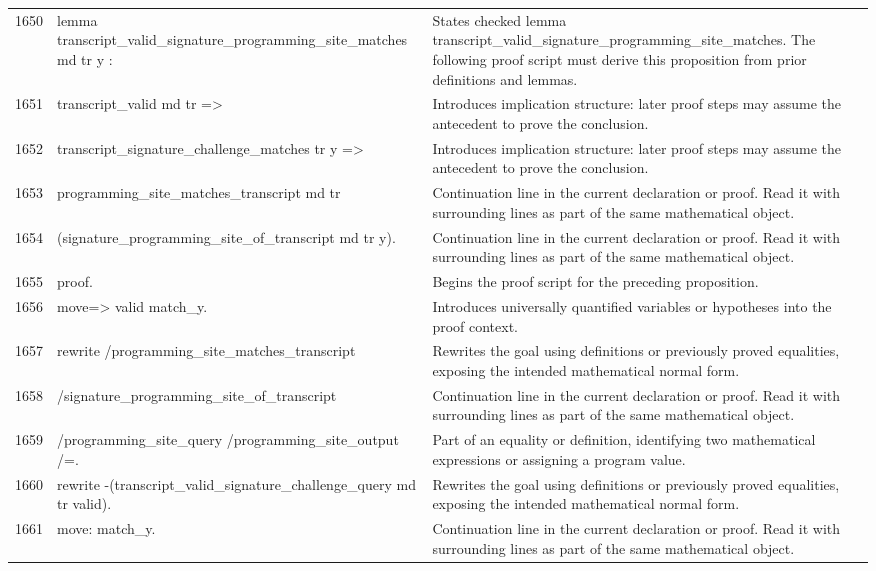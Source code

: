 \documentclass[10pt]{article}
\begin{document}
\begin{longtable}{r L{0.53\textwidth} L{0.37\textwidth}}
1650 & {\ttfamily\scriptsize lemma transcript\_valid\_signature\_programming\_site\_matches md tr y :} & States checked lemma transcript\_valid\_signature\_programming\_site\_matches.  The following proof script must derive this proposition from prior definitions and lemmas. \\
1651 & {\ttfamily\scriptsize   transcript\_valid md tr =>} & Introduces implication structure: later proof steps may assume the antecedent to prove the conclusion. \\
1652 & {\ttfamily\scriptsize   transcript\_signature\_challenge\_matches tr y =>} & Introduces implication structure: later proof steps may assume the antecedent to prove the conclusion. \\
1653 & {\ttfamily\scriptsize   programming\_site\_matches\_transcript md tr} & Continuation line in the current declaration or proof.  Read it with surrounding lines as part of the same mathematical object. \\
1654 & {\ttfamily\scriptsize     (signature\_programming\_site\_of\_transcript md tr y).} & Continuation line in the current declaration or proof.  Read it with surrounding lines as part of the same mathematical object. \\
1655 & {\ttfamily\scriptsize proof.} & Begins the proof script for the preceding proposition. \\
1656 & {\ttfamily\scriptsize move=> valid match\_y.} & Introduces universally quantified variables or hypotheses into the proof context. \\
1657 & {\ttfamily\scriptsize rewrite /programming\_site\_matches\_transcript} & Rewrites the goal using definitions or previously proved equalities, exposing the intended mathematical normal form. \\
1658 & {\ttfamily\scriptsize         /signature\_programming\_site\_of\_transcript} & Continuation line in the current declaration or proof.  Read it with surrounding lines as part of the same mathematical object. \\
1659 & {\ttfamily\scriptsize         /programming\_site\_query /programming\_site\_output /=.} & Part of an equality or definition, identifying two mathematical expressions or assigning a program value. \\
1660 & {\ttfamily\scriptsize rewrite -(transcript\_valid\_signature\_challenge\_query md tr valid).} & Rewrites the goal using definitions or previously proved equalities, exposing the intended mathematical normal form. \\
1661 & {\ttfamily\scriptsize move: match\_y.} & Continuation line in the current declaration or proof.  Read it with surrounding lines as part of the same mathematical object. \\

\end{longtable}
\end{document}
